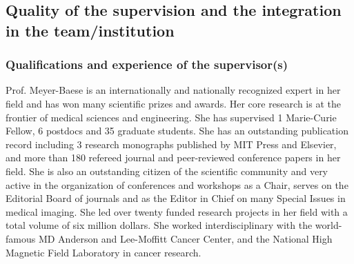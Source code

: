 
 



\subsection{Quality of the supervision and the integration in the team/institution}
\label{sec:supervision}

\subsubsection*{Qualifications and experience of the supervisor(s)}

Prof. Meyer-Baese is an internationally and nationally recognized expert in her field and has won many scientific prizes and awards.
Her core research is at the frontier of medical sciences and engineering.
She has supervised 1 Marie-Curie Fellow, 6 postdocs and 35 graduate students.
She has an outstanding publication record including 3 research monographs published by MIT Press and Elsevier, and more than 180 refereed journal and peer-reviewed conference papers in her field.
She is also an outstanding citizen of the scientific community and very active in the organization of conferences and workshops as a Chair, serves on the Editorial Board of journals and as the Editor in Chief on many Special Issues in medical imaging.
She led over twenty funded research projects in her field with a total volume of six million dollars.
She worked interdisciplinary with the world- famous MD Anderson and Lee-Moffitt Cancer Center, and the National High Magnetic Field Laboratory in cancer research.

